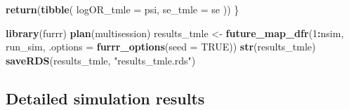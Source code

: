 \documentclass[
]{article}
\newenvironment{Shaded}{\begin{snugshade}}{\end{snugshade}}
\newcommand{\AttributeTok}[1]{\textcolor[rgb]{0.13,0.29,0.53}{#1}}
\newcommand{\ConstantTok}[1]{\textcolor[rgb]{0.56,0.35,0.01}{#1}}
\newcommand{\DecValTok}[1]{\textcolor[rgb]{0.00,0.00,0.81}{#1}}
\newcommand{\FunctionTok}[1]{\textcolor[rgb]{0.13,0.29,0.53}{\textbf{#1}}}
\newcommand{\NormalTok}[1]{#1}
\newcommand{\OtherTok}[1]{\textcolor[rgb]{0.56,0.35,0.01}{#1}}
\newcommand{\SpecialCharTok}[1]{\textcolor[rgb]{0.81,0.36,0.00}{\textbf{#1}}}
\newcommand{\StringTok}[1]{\textcolor[rgb]{0.31,0.60,0.02}{#1}}
\begin{document}
\begin{Shaded}
\begin{Highlighting}[]
  \FunctionTok{return}\NormalTok{(}\FunctionTok{tibble}\NormalTok{(}
    \AttributeTok{logOR\_tmle =}\NormalTok{ psi,}
    \AttributeTok{se\_tmle =}\NormalTok{ se}
\NormalTok{  ))}
\NormalTok{\}}

\FunctionTok{library}\NormalTok{(furrr)}
\FunctionTok{plan}\NormalTok{(multisession)}
\NormalTok{results\_tmle }\OtherTok{\textless{}{-}} \FunctionTok{future\_map\_dfr}\NormalTok{(}\DecValTok{1}\SpecialCharTok{:}\NormalTok{nsim, run\_sim, }\AttributeTok{.options =} \FunctionTok{furrr\_options}\NormalTok{(}\AttributeTok{seed =} \ConstantTok{TRUE}\NormalTok{))}
\FunctionTok{str}\NormalTok{(results\_tmle)}
\FunctionTok{saveRDS}\NormalTok{(results\_tmle, }\StringTok{"results\_tmle.rds"}\NormalTok{)}
\end{Highlighting}
\end{Shaded}

\subsection{Detailed simulation
results}\label{detailed-simulation-results}
\end{document}
